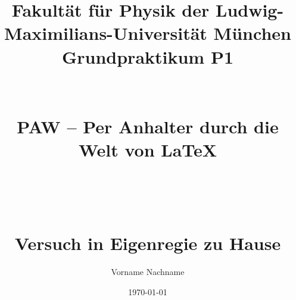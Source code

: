 \documentclass[a4paper,10pt]{report}
\begin{document}
	
	
	
	
	\title{{\large {\sf Fakultät für Physik der Ludwig-Maximilians-Universität München}\\
		{\bf Grundpraktikum P1}}\\ ~ \\ ~ \\
		PAW -- Per Anhalter durch die Welt von \LaTeX
		\\ ~ \\ ~ \\ ~ \\
		{\large Versuch in Eigenregie zu Hause} 
	}
	
	\author{Vorname Nachname}
	
	\date{\today}
	
	\maketitle
	
	
	
\end{document}
